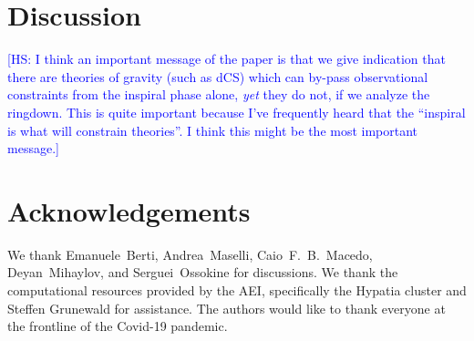 \documentclass[twocolumn,prd,aps,superscriptaddress,preprintnumbers,tightenlines,showpacs,nofootinbib,eqsecnum,amsfonts,amsmath,longbibliography]{revtex4-1}
\newcommand{\hs}[1]{{\textcolor{blue}{{[HS: #1]}} }}
\begin{document}
\section{Discussion}
\label{sec:discussion}

\hs{I think an important message of the paper is that we give indication that
there are theories of gravity (such as dCS) which can by-pass observational
constraints from the inspiral phase alone, {\it yet} they do not, if we
analyze the ringdown. This is quite important because I've frequently heard
that the ``inspiral is what will constrain theories''. I think this might be
the most important message.}

\section*{Acknowledgements}
\label{sec:acknowledgements}
%
We thank Emanuele~Berti, Andrea~Maselli, Caio~F.~B.~Macedo, Deyan~Mihaylov, and
Serguei~Ossokine for discussions.
%
We thank the computational resources provided by the AEI, specifically the
{\sc Hypatia} cluster and Steffen Grunewald for assistance.
%
The authors would like to thank everyone at the frontline of the Covid-19
pandemic.

% 

\end{document}
